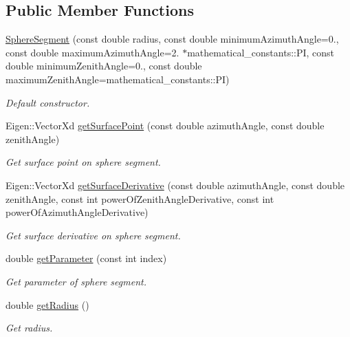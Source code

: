 \subsection*{Public Member Functions}
\begin{DoxyCompactItemize}
\item 
\hyperlink{classtudat_1_1geometric__shapes_1_1SphereSegment_a2f89ff03c7ebba10220d16476afc2f62}{Sphere\+Segment} (const double radius, const double minimum\+Azimuth\+Angle=0., const double maximum\+Azimuth\+Angle=2. $\ast$mathematical\+\_\+constants\+::\+PI, const double minimum\+Zenith\+Angle=0., const double maximum\+Zenith\+Angle=mathematical\+\_\+constants\+::\+PI)
\begin{DoxyCompactList}\small\item\em Default constructor. \end{DoxyCompactList}\item 
Eigen\+::\+Vector\+Xd \hyperlink{classtudat_1_1geometric__shapes_1_1SphereSegment_aa422df17ac81a397705cff25fbe7c636}{get\+Surface\+Point} (const double azimuth\+Angle, const double zenith\+Angle)
\begin{DoxyCompactList}\small\item\em Get surface point on sphere segment. \end{DoxyCompactList}\item 
Eigen\+::\+Vector\+Xd \hyperlink{classtudat_1_1geometric__shapes_1_1SphereSegment_a3f5a5556ca7fb2ab256fda395d2d12a7}{get\+Surface\+Derivative} (const double azimuth\+Angle, const double zenith\+Angle, const int power\+Of\+Zenith\+Angle\+Derivative, const int power\+Of\+Azimuth\+Angle\+Derivative)
\begin{DoxyCompactList}\small\item\em Get surface derivative on sphere segment. \end{DoxyCompactList}\item 
double \hyperlink{classtudat_1_1geometric__shapes_1_1SphereSegment_a926f414faa86172162ff21ea2ff69bd5}{get\+Parameter} (const int index)
\begin{DoxyCompactList}\small\item\em Get parameter of sphere segment. \end{DoxyCompactList}\item 
double \hyperlink{classtudat_1_1geometric__shapes_1_1SphereSegment_a622ea20a8f2cf810f9af8000ea8be669}{get\+Radius} ()
\begin{DoxyCompactList}\small\item\em Get radius. \end{DoxyCompactList}\item 

\end{DoxyCompactItemize}
